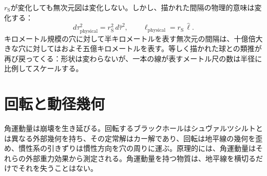 \(r_{\mathrm S}\)が変化しても無次元図は変化しない。しかし、描かれた間隔の物理的意味は変化する：
\begin{equation}
d\tau_{\mathrm{physical}}^2
=
r_{\mathrm S}^2\,d\hat{\tau}^2,
\qquad
\ell_{\mathrm{physical}}
=
r_{\mathrm S}\,\hat{\ell}.
\label{eq:l7-scale-restoration}
\end{equation}
キロメートル規模の穴に対して半キロメートルを表す無次元の間隔は、十億倍大きな穴に対してはおよそ五億キロメートルを表す。等しく描かれた球との類推が再び戻ってくる：形状は変わらないが、一本の線が表すメートル尺の数は半径に比例してスケールする。

\begin{classroomqa}
\end{classroomqa}

\begin{classroomqa}
\end{classroomqa}

\begin{classroomqa}
\end{classroomqa}

\section{回転と動径幾何}

角運動量は崩壊を生き延びる。回転するブラックホールはシュヴァルツシルトとは異なる外部幾何を持ち、その定常解はカー解であり、回転は地平線の幾何を歪め、慣性系の引きずりは慣性方向を穴の周りに運ぶ。原理的には、角運動量はそれらの外部重力効果から測定される。角運動量を持つ物質は、地平線を横切るだけでそれを失うことはない。

